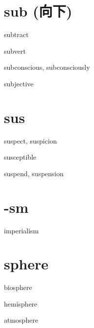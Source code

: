 \section{sub (向下)}

\begin{RefWord}{subtract}
\end{RefWord}

\begin{RefWord}{subvert}
\end{RefWord}

\begin{RefWord}{subconscious, subconsciously}
\end{RefWord}

\begin{RefWord}{subjective}
\end{RefWord}

\section{sus}

\begin{RefWord}{suspect, suspicion}
\end{RefWord}

\begin{RefWord}{susceptible}
\end{RefWord}

\begin{RefWord}{suspend, suspension}
\end{RefWord}

\section{-sm}

\begin{RefWord}{imperialism}
\end{RefWord}

\section{sphere}
\begin{RefWord}{biosphere}
\end{RefWord}

\begin{RefWord}{hemisphere}
\end{RefWord}

\begin{RefWord}{atmosphere}
\end{RefWord}

